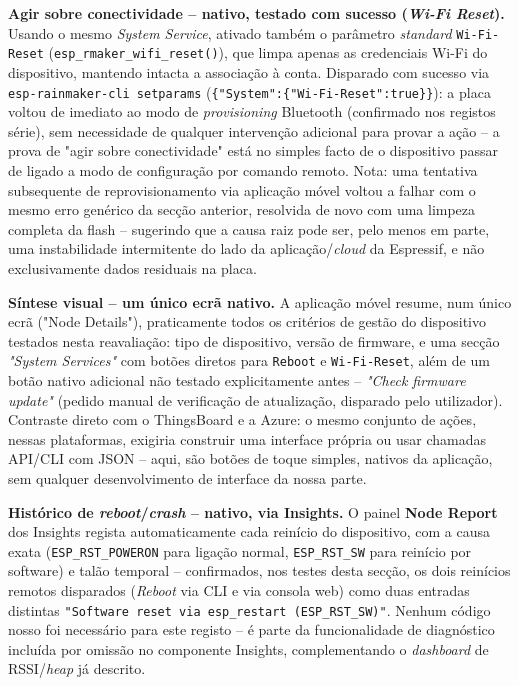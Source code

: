 \documentclass[a4paper,12pt]{article}
\begin{document}
\textbf{Agir sobre conectividade -- nativo, testado com sucesso (\textit{Wi-Fi Reset}).} Usando o mesmo \textit{System Service}, ativado também o parâmetro \textit{standard} \texttt{Wi-Fi-Reset} (\texttt{esp\_rmaker\_wifi\_reset()}), que limpa apenas as credenciais Wi-Fi do dispositivo, mantendo intacta a associação à conta. Disparado com sucesso via \texttt{esp-rainmaker-cli setparams} (\texttt{\{"System":\{"Wi-Fi-Reset":true\}\}}): a placa voltou de imediato ao modo de \textit{provisioning} Bluetooth (confirmado nos registos série), sem necessidade de qualquer intervenção adicional para provar a ação -- a prova de "agir sobre conectividade" está no simples facto de o dispositivo passar de ligado a modo de configuração por comando remoto. Nota: uma tentativa subsequente de reprovisionamento via aplicação móvel voltou a falhar com o mesmo erro genérico da secção anterior, resolvida de novo com uma limpeza completa da flash -- sugerindo que a causa raiz pode ser, pelo menos em parte, uma instabilidade intermitente do lado da aplicação/\textit{cloud} da Espressif, e não exclusivamente dados residuais na placa.

\textbf{Síntese visual -- um único ecrã nativo.} A aplicação móvel resume, num único ecrã ("Node Details"), praticamente todos os critérios de gestão do dispositivo testados nesta reavaliação: tipo de dispositivo, versão de firmware, e uma secção \textit{"System Services"} com botões diretos para \texttt{Reboot} e \texttt{Wi-Fi-Reset}, além de um botão nativo adicional não testado explicitamente antes -- \textit{"Check firmware update"} (pedido manual de verificação de atualização, disparado pelo utilizador). Contraste direto com o ThingsBoard e a Azure: o mesmo conjunto de ações, nessas plataformas, exigiria construir uma interface própria ou usar chamadas API/CLI com JSON -- aqui, são botões de toque simples, nativos da aplicação, sem qualquer desenvolvimento de interface da nossa parte.

\textbf{Histórico de \textit{reboot}/\textit{crash} -- nativo, via Insights.} O painel \textbf{Node Report} dos Insights regista automaticamente cada reinício do dispositivo, com a causa exata (\texttt{ESP\_RST\_POWERON} para ligação normal, \texttt{ESP\_RST\_SW} para reinício por software) e talão temporal -- confirmados, nos testes desta secção, os dois reinícios remotos disparados (\textit{Reboot} via CLI e via consola web) como duas entradas distintas \texttt{"Software reset via esp\_restart (ESP\_RST\_SW)"}. Nenhum código nosso foi necessário para este registo -- é parte da funcionalidade de diagnóstico incluída por omissão no componente Insights, complementando o \textit{dashboard} de RSSI/\textit{heap} já descrito.
\end{document}
